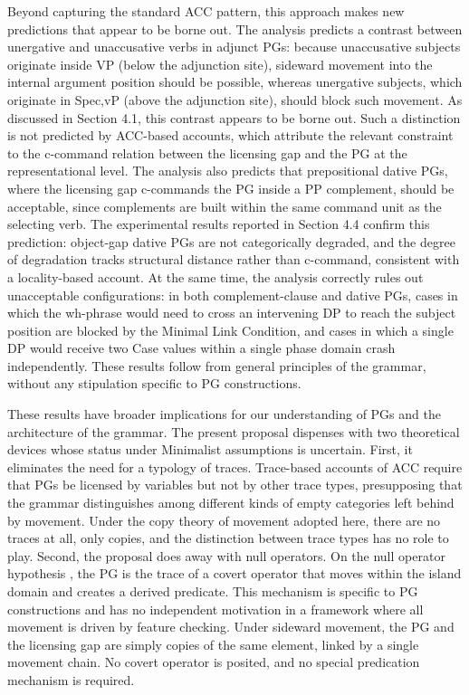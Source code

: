 \documentclass[12pt]{article}
\begin{document}
Beyond capturing the standard ACC pattern, this approach makes new predictions that appear to be borne out. The analysis predicts a contrast between unergative and unaccusative verbs in adjunct PGs: because unaccusative subjects originate inside VP (below the adjunction site), sideward movement into the internal argument position should be possible, whereas unergative subjects, which originate in Spec,vP (above the adjunction site), should block such movement. As discussed in Section 4.1, this contrast appears to be borne out. Such a distinction is not predicted by ACC-based accounts, which attribute the relevant constraint to the c-command relation between the licensing gap and the PG at the representational level. The analysis also predicts that prepositional dative PGs, where the licensing gap c-commands the PG inside a PP complement, should be acceptable, since complements are built within the same command unit as the selecting verb. The experimental results reported in Section 4.4 confirm this prediction: object-gap dative PGs are not categorically degraded, and the degree of degradation tracks structural distance rather than c-command, consistent with a locality-based account. At the same time, the analysis correctly rules out unacceptable configurations: in both complement-clause and dative PGs, cases in which the wh-phrase would need to cross an intervening DP to reach the subject position are blocked by the Minimal Link Condition, and cases in which a single DP would receive two Case values within a single phase domain crash independently. These results follow from general principles of the grammar, without any stipulation specific to PG constructions.

These results have broader implications for our understanding of PGs and the architecture of the grammar. The present proposal dispenses with two theoretical devices whose status under Minimalist assumptions is uncertain. First, it eliminates the need for a typology of traces. Trace-based accounts of ACC require that PGs be licensed by variables but not by other trace types, presupposing that the grammar distinguishes among different kinds of empty categories left behind by movement. Under the copy theory of movement adopted here, there are no traces at all, only copies, and the distinction between trace types has no role to play. Second, the proposal does away with null operators. On the null operator hypothesis \citep{chomsky1986}, the PG is the trace of a covert operator that moves within the island domain and creates a derived predicate. This mechanism is specific to PG constructions and has no independent motivation in a framework where all movement is driven by feature checking. Under sideward movement, the PG and the licensing gap are simply copies of the same element, linked by a single movement chain. No covert operator is posited, and no special predication mechanism is required.
\end{document}
